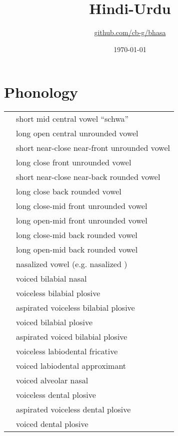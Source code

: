 \documentclass[12pt]{article}
\title{Hindi-Urdu\\\ipa{["HIndi: "URdu:]}}
\author{\href{https://github.com/cb-g/bhasa}{github.com/cb-g/bhasa}}
\date{\today}
\begin{document}
\pagecolor{custom_bg}\color{custom_fg}
\maketitle\thispagestyle{empty}

\newpage\setcounter{page}{1}\section{Phonology}

\begin{xltabular}{\textwidth}{lL}
   & short mid central vowel ``schwa'' \\
   & long open central unrounded vowel \\
   & short near-close near-front unrounded vowel \\
   & long close front unrounded vowel \\
   & short near-close near-back rounded vowel \\
   & long close back rounded vowel \\
   & long close-mid front unrounded vowel \\
   & long open-mid front unrounded vowel \\
   & long close-mid back rounded vowel \\
   & long open-mid back rounded vowel \\
   & nasalized vowel (e.g. nasalized ) \\
   & voiced bilabial nasal \\
   & voiceless bilabial plosive \\
   & aspirated voiceless bilabial plosive \\
   & voiced bilabial plosive \\
   & aspirated voiced bilabial plosive \\
   & voiceless labiodental fricative \\
   & voiced labiodental approximant \\
   & voiced alveolar nasal \\
   & voiceless dental plosive \\
   & aspirated voiceless dental plosive \\
   & voiced dental plosive \\

\end{xltabular}
\end{document}

